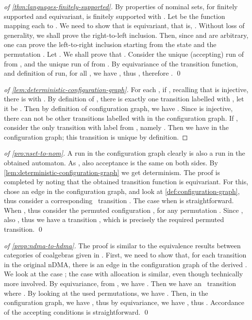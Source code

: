 

\begin{proof}[of \cref{thm:languages-finitely-supported}]
By properties of nominal sets, for  finitely supported and  equivariant,  is finitely supported with . Let  be the function mapping each  to . We need to show that  is equivariant, that is, . Without loss of generality, we shall prove the right-to-left inclusion. Then, since  and  are arbitrary, one can prove the left-to-right inclusion starting from the state  and the permutation . Let . We shall prove that . Consider the unique (accepting) run  of  from , and  the unique run  of  from . By equivariance of the transition function, and definition of run, for all , we have , thus , therefore . 
\qed 
\end{proof}
\begin{proof}[of \cref{lem:deterministic-configuration-graph}]
 For each , if , recalling that  is injective, there is  with . By definition of \hdma, there is exactly one transition labelled with , let it be . Then by definition of configuration graph, we have . Since  is injective, there can not be other transitions labelled with  in the configuration graph. If , consider the only transition with label  from , namely .  Then we have  in the configuration graph; this transition is unique by definition.
\end{proof}

\begin{proof}[of \cref{pro:nset-to-nom}]
 A run  in the configuration graph clearly is also a run in the obtained automaton. As , also acceptance is the same on both sides. By \cref{lem:deterministic-configuration-graph} we get determinism. The proof is completed by noting that the obtained transition function is equivariant. For this, chose an edge  in the configuration graph, and look at \cref{def:configuration-graph}, thus consider a corresponding \hdma\ transition . The case when  is straightforward. When , thus  consider the permuted configuration ,  for any permutation . Since , also  , thus we have a transition , which is precisely the required permuted transition. \qed
\end{proof}



\begin{proof}[of \cref{prop:ndma-to-hdma}]
 The proof is similar to the equivalence results between categories of coalgebras given in \cite{CianciaM10}. First, we need to show that, for each transition  in the original nDMA, there is an edge  in the configuration graph of the derived \hdma. We look at the case ; the case with allocation is similar, even though technically more involved. By equivariance, from , we have . Then we have an \hdma\ transition  where . 
 By looking at the used permutations, we have . 
 Then, in the configuration graph, we have , thus by equivariance, we have 
 , 
 thus . Accordance of the accepting conditions is straightforward.
 \qed
\end{proof}


